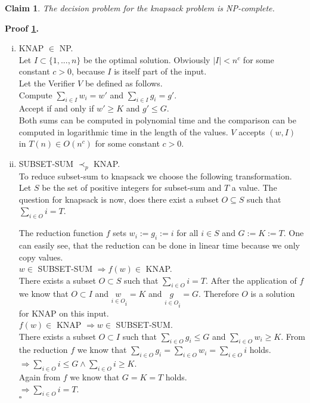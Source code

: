 \documentclass[11pt,a4paper,ngerman]{article}
\newtheorem{lemma}{\bfseries Claim}
\begin{document}
\begin{lemma}\label{cmp:ex1:knap:np}
The decision problem for the knapsack problem is NP-complete.
\end{lemma}
\textbf{Proof \ref{cmp:ex1:knap:np}.}\\
\begin{enumerate}[i)]
    \item KNAP $\in$ NP.\\
        Let $I \subset \{ 1, ... , n \}$ be the optimal solution. Obviously $|I| < n^c$ for some constant $c>0$,
        because $I$ is itself part of the input.\\
        Let the Verifier $V$ be defined as follows.\\
        Compute $\underset{i \in I}{\sum} w_i = w'$ and 
        $\underset{i \in I}{\sum} g_i = g'$.\\
        Accept if and only if $w' \geq K$ and $ g' \leq G$.\\

        Both sums can be computed in polynomial time and the comparison can be computed
        in logarithmic time in the length of the values.
        $V$ accepts $(w,I)$ in $T(n) \in O(n^c)$ for some constant $c>0$.

    \item SUBSET-SUM $\prec_p$ KNAP.\\
        To reduce subset-sum to knapsack we choose the following transformation. Let $S$ be the set of
        positive integers for subset-sum and $T$ a value. The question for knapsack is now, does there exist
        a subset $O \subseteq S$ such that $\underset{i \in O}{\sum} i = T$.

        The reduction function $f$ sets $w_i := g_i := i$ for all $i \in S$ and $G := K := T$. One can
        easily see, that the reduction can be done in linear time because we only copy values. \\

        $w \in$ SUBSET-SUM $\Rightarrow f(w) \in$ KNAP.\\
        There exists a subset $O \subset S$ such that $\underset{i \in O}{\sum} i = T$.
        After the application of $f$ we know that $O \subset I$ and
        $\underset{i \in O} w_i = K$ and $\underset{i \in O} g_i = G$. Therefore $O$ is a solution for
        KNAP on this input.\\

        $f(w) \in$ KNAP $\Rightarrow w \in$ SUBSET-SUM.\\
        There exists a subset $O \subset I$ such that $\underset{i \in O}{\sum} g_i \leq G$ and $\underset{i \in O}{\sum} w_i \geq K$.
        From the reduction $f$ we know that $\underset{i \in O}{\sum} g_i = \underset{i \in O}{\sum} w_i = \underset{i \in O}{\sum} i$ holds.\\
        $\Rightarrow \underset{i \in O}{\sum} i \leq G \land \underset{i \in O}{\sum} i \geq K$.\\
        Again from $f$ we know that $G = K = T$ holds.\\
        $\Rightarrow \underset{i \in O}{\sum} i = T$.\\
\mbox{} \hfill $\square$
\end{enumerate}
\end{document}
